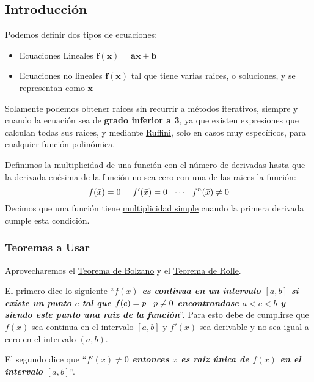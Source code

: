 \subsection{Introducción}
\noindent Podemos definir dos tipos de ecuaciones:
\begin{itemize}
        \item Ecuaciones Lineales \(\mathbf{f(x) = ax +b}\)
        \item Ecuaciones no lineales \(\mathbf{f(x)}\) tal que tiene varias raices, o soluciones, y se representan como \(\mathbf{\bar{x}}\)
\end{itemize}
\noindent Solamente podemos obtener raices sin recurrir a métodos iterativos, siempre y cuando la ecuación sea de \textbf{grado inferior a 3}, ya que existen expresiones que calculan todas sus raices, y mediante \underline{Ruffini}, solo en casos muy específicos, para cualquier función polinómica.
\par
\vspace{.5cm}
\noindent Definimos la \underline{multiplicidad} de una función con el número de derivadas hasta que la derivada enésima de la función no sea cero con una de las raices la función:
\[
        f(\bar{x}) = 0 \hspace{5mm}f'(\bar{x}) = 0 \hspace{2.5mm} \cdots \hspace{2.5mm} f^n(\bar{x}) \not = 0
\]
Decimos que una función tiene \underline{multiplicidad simple} cuando la primera derivada cumple esta condición.
\subsubsection{Teoremas a Usar}
\noindent Aprovecharemos el \underline{Teorema de Bolzano} y el \underline{Teorema de Rolle}.\par \vspace{5mm}
\noindent El primero dice lo siguiente ``\textbf{\textit{\(f(x)\) es continua en un intervalo \([a,b]\) si existe un punto \(c\) tal que \(f(c) = p \hspace{3mm} p \neq 0\) encontrandose \(a < c < b\) y siendo este punto una raiz de la función}}''. Para esto debe de cumplirse que \(f(x)\) sea continua en el intervalo \([a,b]\) y \(f'(x)\) sea derivable y no sea igual a cero en el intervalo \((a,b)\). \par \vspace{3mm}
\noindent El segundo dice que ``\textbf{\textit{\(f'(x) \neq 0 \) entonces \(x\) es raiz única de \(f(x)\) en el intervalo \([a,b]\)}}''.
